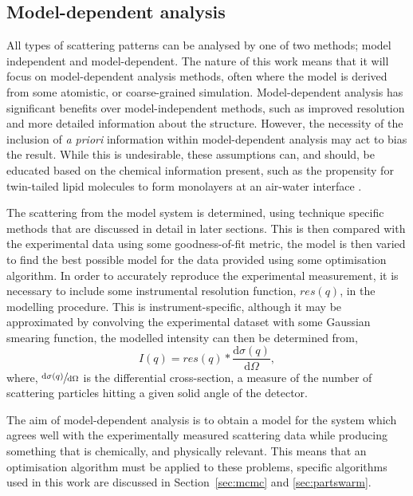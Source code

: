 \subsection{Model-dependent analysis}

All types of scattering patterns can be analysed by one of two methods; model independent and model-dependent.
The nature of this work means that it will focus on model-dependent analysis methods, often where the model is derived from some atomistic, or coarse-grained simulation. Model-dependent analysis has significant benefits over model-independent methods, such as improved resolution and more detailed information about the structure.
However, the necessity of the inclusion of \emph{a priori} information within model-dependent analysis may act to bias the result.
While this is undesirable, these assumptions can, and should, be educated based on the chemical information present, such as the propensity for twin-tailed lipid molecules to form monolayers at an air-water interface \cite{mccluskey_model-dependent_2018}.

The scattering from the model system is determined, using technique specific methods that are discussed in detail in later sections.
This is then compared with the experimental data using some goodness-of-fit metric, the model is then varied to find the best possible model for the data provided using some optimisation algorithm.
In order to accurately reproduce the experimental measurement, it is necessary to include some instrumental resolution function, $res(q)$, in the modelling procedure.
This is instrument-specific, although it may be approximated by convolving the experimental dataset with some Gaussian smearing function, the modelled intensity can then be determined from,
%
\begin{equation}
    I(q) = res(q) * \frac{\text{d}\sigma(q)}{\text{d}\Omega},
\end{equation}
%
where, $\sfrac{\text{d}\sigma(q)}{\text{d}\Omega}$ is the differential cross-section, a measure of the number of scattering particles hitting a given solid angle of the detector.

The aim of model-dependent analysis is to obtain a model for the system which agrees well with the experimentally measured scattering data while producing something that is chemically, and physically relevant.
This means that an optimisation algorithm must be applied to these problems, specific algorithms used in this work are discussed in Section~\ref{sec:mcmc} and \ref{sec:partswarm}.

